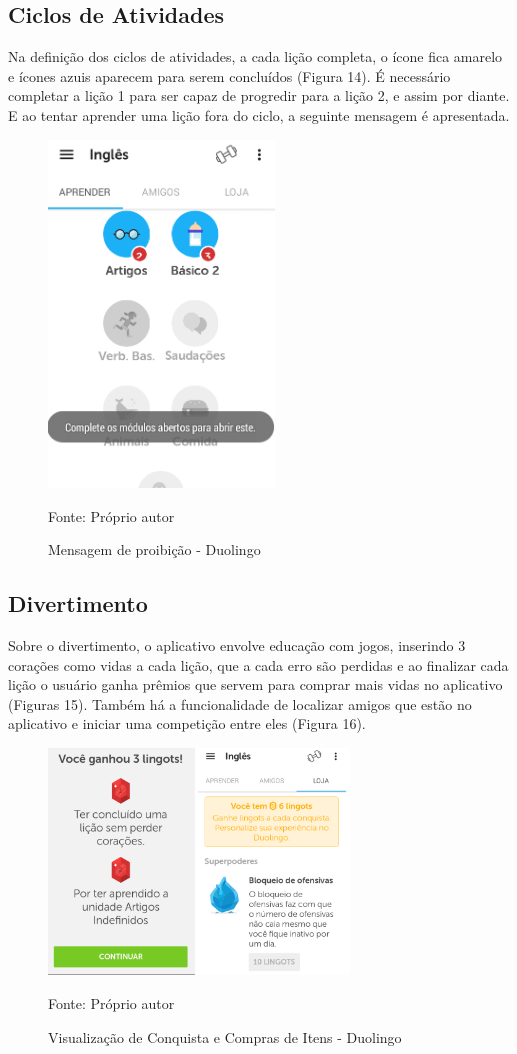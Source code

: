 \documentclass[
	12pt,				%
	openany,			%
	oneside,			%
	a4paper,			%
	english,			%
	french,				%
	spanish,			%
	brazil				%
	]{abntex2}
\begin{document}
\subsection{Ciclos de Atividades} 
	Na definição dos ciclos de atividades, a cada lição completa, o ícone fica amarelo e ícones azuis aparecem para serem concluídos (Figura 14). É necessário completar a lição 1 para ser capaz de progredir para a lição 2, e assim por diante. E ao tentar aprender uma lição fora do ciclo, a seguinte mensagem é apresentada.
\begin{figure}[H]
    \centering
\caption{Mensagem de proibição - Duolingo}
\includegraphics[width=6cm]{figuras/proibicaoduolingo.png}
\par
 Fonte: Próprio autor
\end{figure}

\subsection{Divertimento}
	Sobre o divertimento, o aplicativo envolve educação com jogos, inserindo 3 corações como vidas a cada lição, que a cada erro são perdidas e ao finalizar cada lição o usuário ganha prêmios que servem para comprar mais vidas no aplicativo (Figuras 15). Também há a funcionalidade de localizar amigos que estão no aplicativo e iniciar uma competição entre eles (Figura 16).

\begin{figure}[H]
    \centering
\caption{Visualização de Conquista e Compras de Itens - Duolingo}
\includegraphics[width=8cm]{figuras/conquistaduolingo.png}
\par
 Fonte: Próprio autor
\end{figure}
\end{document}
